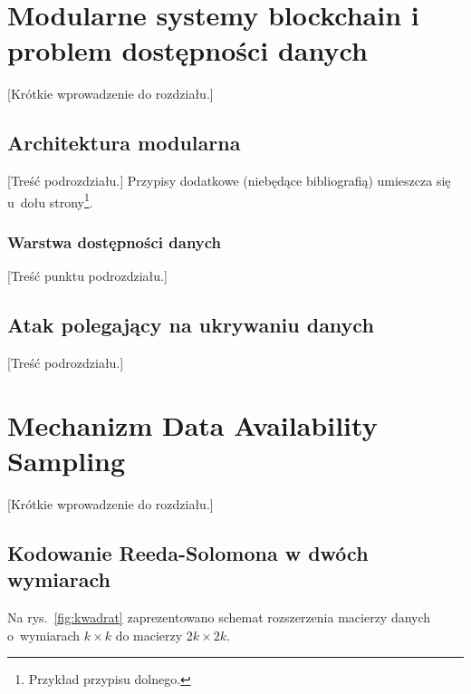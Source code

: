 \documentclass[a4paper,12pt,twoside,openany]{report}
\begin{document}
\chapter{Modularne systemy blockchain i problem dostępności danych}
\label{chap:modularne}

[Krótkie wprowadzenie do rozdziału.]

\section{Architektura modularna}
\label{sec:architektura}

[Treść podrozdziału.] Przypisy dodatkowe (niebędące bibliografią) umieszcza się
u~dołu strony\footnote{Przykład przypisu dolnego.}.

\subsection{Warstwa dostępności danych}

[Treść punktu podrozdziału.]

\section{Atak polegający na ukrywaniu danych}

 [Treść podrozdziału.]

\chapter{Mechanizm Data Availability Sampling}
\label{chap:das}

[Krótkie wprowadzenie do rozdziału.]

\section{Kodowanie Reeda-Solomona w dwóch wymiarach}

Na rys.~\ref{fig:kwadrat} zaprezentowano schemat rozszerzenia macierzy danych
o~wymiarach $k \times k$ do macierzy $2k \times 2k$.
\end{document}
